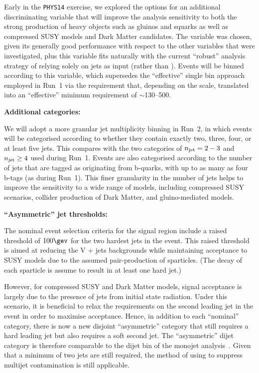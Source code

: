 Early in the \texttt{PHYS14} exercise, we explored the options for an
additional discriminating variable that will improve the analysis
sensitivity to both the strong production of heavy objects such as
gluinos and squarks as well as compressed SUSY models and Dark Matter
candidates. The variable \mht was chosen, given its generally good
performance with respect to the other variables that were
investigated, plus this variable fits naturally with the current
``robust'' analysis strategy of relying solely on jets as input
(rather than \eg \met). Events will be binned according to this
variable, which supersedes the ``effective'' single bin approach
employed in Run~1 via the \alphat requirement that, depending on the
\HT scale, translated into an ``effective'' minimum \mht requirement
of $\sim$130--500\gev.

{\bf Additional \njet categories:}

We will adopt a more granular jet multiplicity binning in Run~2, in
which events will be categorised according to whether they contain
exactly two, three, four, or at least five jets. This compares with
the two categories of $n_{\text{jet}} = 2-3$ and $n_{\text{jet}} \geq 4$ used during
Run~1. Events are also categorised according to the number of jets
that are tagged as originating from b-quarks, with up to as many as
four b-tags (as during Run~1). This finer granularity in the number of
jets helps to improve the sensitivity to a wide range of models,
including compressed SUSY scenarios, collider production of Dark
Matter, and gluino-mediated models.

{\bf ``Asymmetric'' jet \Pt thresholds:}

The nominal event selection criteria for the signal region include a
raised threshold of $100\gev$ for the two hardest jets in the
event. This raised threshold is aimed at reducing the V + jets
backgrounds while maintaining acceptance to SUSY models due to the
assumed pair-production of sparticles. (The decay of each
sparticle is assume to result in at least one hard jet.) 

However, for compressed SUSY and Dark Matter models, signal acceptance
is largely due to the presence of jets from initial state
radiation. Under this scenario, it is beneficial to relax the
requirements on the second leading jet in the event in order to
maximise acceptance. Hence, in addition to each ``nominal'' \njet
category, there is now a new disjoint ``asymmetric'' \njet category
that still requires a hard leading jet but also requires a soft second
jet. The ``asymmetric'' dijet category is therefore comparable to the
dijet bin of the monojet analysis~\cite{Chatrchyan:2011nd,
Chatrchyan:2012me, Khachatryan:2014rra}. Given that a minimum of two
jets are still required, the method of using \alphat to suppress
multijet contamination is still applicable.


